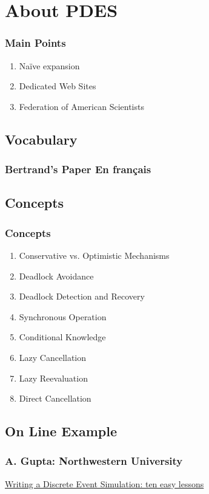 % 

\section{About PDES}%
\begin{frame}\frametitle{Main Points}
\begin{enumerate}
	\item Naïve expansion
	\item Dedicated Web Sites
	\item Federation of American Scientists
\end{enumerate}
\end{frame}


\subsection{Vocabulary}
\begin{frame}\frametitle{Bertrand's Paper En fran\c{c}ais}
\end{frame}


\subsection{Concepts}
\begin{frame}[ allowframebreaks ]\frametitle{Concepts}
\begin{enumerate}
	\item Conservative vs. Optimistic Mechanisms
	\item Deadlock Avoidance
	\item Deadlock Detection and Recovery
	\item Synchronous Operation
	\item Conditional Knowledge 
	\item Lazy Cancellation
	\item Lazy Reevaluation
	\item Direct Cancellation
\end{enumerate}
\end{frame}

\subsection{On Line Example}
\begin{frame}\frametitle{A. Gupta: Northwestern University}
	\href{https://users.cs.northwestern.edu/~agupta/_projects/networking/QueueSimulation/mm1.html}{Writing a Discrete Event Simulation: ten easy lessons}
\end{frame}


\endinput  %

